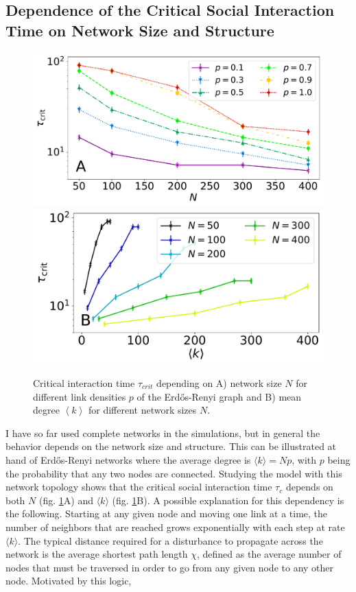 \subsection{Dependence of the Critical Social Interaction Time on Network Size and Structure}  
\begin{figure}
  \centering
  \includegraphics[width = .6 \textwidth]{figures/taucrit_N2.pdf}
  \includegraphics[width = .6 \textwidth]{figures/taucrit_N_k.pdf}
\caption{Critical interaction time $\tau_{crit}$ depending on A) network size $N$ for different link densities $p$ of the Erd\H{o}s-Renyi graph and B) mean degree $\left< k \right>$ for different network sizes $N$.}
  \label{fig:taucrit}
\end{figure}
I have so far used complete networks in the simulations, but in general the behavior depends on the network size and structure. This can be illustrated at hand of Erd\H{o}s-Renyi networks where the average degree is $\langle k \rangle = Np$, with $p$ being the probability that any two nodes are connected. Studying the model with this network topology shows that the critical social interaction time $\tau_{c}$ depends on both $N$ (fig. \ref{fig:taucrit}A) and $\langle k \rangle$ (fig. \ref{fig:taucrit}B). A possible explanation for this dependency is the following.
Starting at any given node and moving one link at a time, the number of neighbors that are reached grows exponentially with each step at rate $\langle k \rangle$.  
The typical distance required for a disturbance to propagate across the network is the average shortest path length $\chi$, defined as the average number of nodes that must be traversed in order to go from any given node to any other node. Motivated by this logic, 
